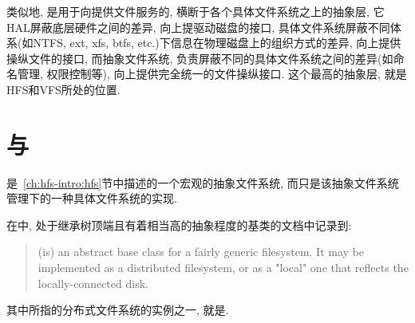 类似地, \HFS 是用于向\Hadoop 提供文件服务的, 横断于各个具体文件系统之上的抽象层, 它
HAL屏蔽底层硬件之间的差异,
向上提驱动磁盘的接口,
具体文件系统屏蔽不同体系(如NTFS, ext, xfs, btfs, etc.)下信息在物理磁盘上的组织方式的差异,
向上提供操纵文件的接口,
而抽象文件系统,
负责屏蔽不同的具体文件系统之间的差异(如命名管理, 权限控制等),
向上提供完全统一的文件操纵接口. 这个最高的抽象层, 就是HFS和VFS所处的位置.

\section{\HadoopFS 与 \HadoopDFS}

\HadoopFS 是~\ref{ch:hfs-intro:hfs}节中描述的一个宏观的抽象文件系统,
而\HadoopDFS 只是该抽象文件系统管理下的一种具体文件系统的实现.

在\HFS 中, 处于继承树顶端且有着相当高的抽象程度的基类\FS 的文档中记录到:
\begin{quote}
(\FS is) an abstract base class for a fairly generic filesystem. It
may be implemented as a distributed filesystem, or as a "local"
one that reflects the locally-connected disk.
\end{quote}
其中所指的分布式文件系统的实例之一, 就是\HDFS.

